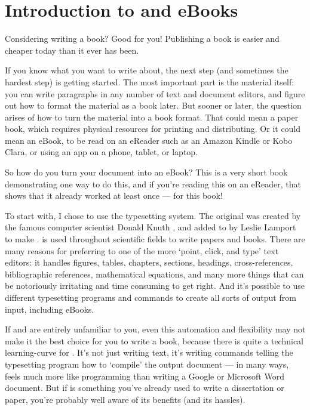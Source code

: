 
\chapter{Introduction to \latex and eBooks}

Considering writing a book? Good for you! Publishing a book is easier and cheaper today 
than it ever has been. 

If you know what you want to write about, the next step (and sometimes the 
hardest step) is getting started. The most important part is the material itself: 
you can write paragraphs in any number of text and document editors, 
and figure out how to format the material as a book later. But sooner or later, 
the question arises of how to turn the material into a book format. That could mean a paper book, 
which requires physical resources for printing and distributing. Or it could mean
an eBook, to be read on an eReader such as an Amazon Kindle or Kobo
Clara, or using an app on a phone, tablet, or laptop.

So how do you turn your document into an eBook? This is a very short book demonstrating one 
way to do this, and if you're reading this on an eReader, that shows
that it already worked at least once --- for this book!

To start with, I chose to use the \latex typesetting system. 
The original \tex was created by the famous computer scientist Donald Knuth \citep{knuth1984texbook},
and added to by Leslie Lamport to make \latex \citep{lamport1985latex}.
\latex is used throughout scientific fields to write papers and books. There are many
reasons for preferring \latex to one of the more `point, click, and type' text editors:
it handles figures, tables, chapters, sections, headings, cross-references, 
bibliographic references, mathematical equations, and many more things that can be 
notoriously irritating and time consuming to get right. And it's possible to use different typesetting
programs and commands to create all sorts of output from \latex input, including eBooks.

If \tex and \latex are entirely unfamiliar to you, even this automation and flexibility 
may not make it the best choice for you to write a book, because there is quite a technical 
learning-curve for \latex. It's not just writing text, it's writing commands telling the
typesetting program how to `compile' the output document --- in many ways, \latex
feels much more like programming than writing a Google or Microsoft Word document. But if
\latex is something you've already used to write a dissertation or paper, you're 
probably well aware of its benefits (and its hassles). 

